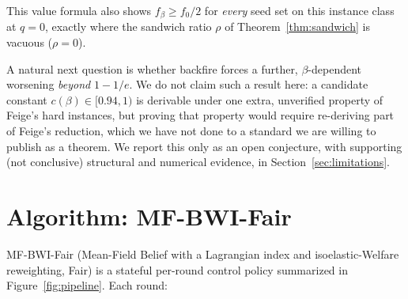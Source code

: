 \documentclass[journal]{IEEEtran}
\begin{document}
This value formula also shows $f_\beta\ge f_0/2$ for \emph{every} seed set
on this instance class at $q=0$, exactly where the sandwich ratio $\rho$ of
Theorem~\ref{thm:sandwich} is vacuous ($\rho=0$).

A natural next question is whether backfire forces a further,
$\beta$-dependent worsening \emph{beyond} $1-1/e$. We do not claim such a
result here: a candidate constant $c(\beta)\in[0.94,1)$ is derivable under
one extra, unverified property of Feige's hard instances, but proving that
property would require re-deriving part of Feige's reduction, which we
have not done to a standard we are willing to publish as a theorem. We
report this only as an open conjecture, with supporting (not conclusive)
structural and numerical evidence, in
Section~\ref{sec:limitations}.

\section{Algorithm: MF-BWI-Fair}
\label{sec:algorithm}

MF-BWI-Fair (Mean-Field Belief with a Lagrangian index and isoelastic-Welfare
reweighting, Fair) is a stateful per-round control policy summarized in
Figure~\ref{fig:pipeline}. Each round:
\end{document}
